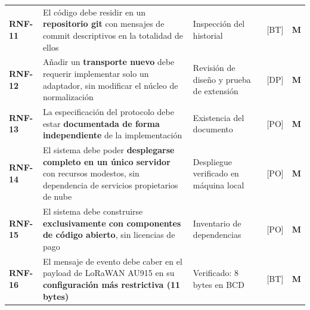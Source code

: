 \begin{longtable}{@{}C{1.7cm}L{7.6cm}L{2.0cm}L{1.4cm}C{1.2cm}@{}}
\textbf{RNF-11} & El código debe residir en un \textbf{repositorio git} con mensajes de commit descriptivos en la totalidad de ellos & Inspección del historial & [BT] & \textbf{M} \\
\textbf{RNF-12} & Añadir un \textbf{transporte nuevo} debe requerir implementar solo un adaptador, sin modificar el núcleo de normalización & Revisión de diseño y prueba de extensión & [DP] & \textbf{M} \\
\textbf{RNF-13} & La especificación del protocolo debe estar \textbf{documentada de forma independiente} de la implementación & Existencia del documento & [PO] & \textbf{M} \\
\textbf{RNF-14} & El sistema debe poder \textbf{desplegarse completo en un único servidor} con recursos modestos, sin dependencia de servicios propietarios de nube & Despliegue verificado en máquina local & [PO] & \textbf{M} \\
\textbf{RNF-15} & El sistema debe construirse \textbf{exclusivamente con componentes de código abierto}, sin licencias de pago & Inventario de dependencias & [PO] & \textbf{M} \\
\textbf{RNF-16} & El mensaje de evento debe caber en el payload de LoRaWAN AU915 en su \textbf{configuración más restrictiva (11 bytes)} & Verificado: 8 bytes en BCD & [BT] & \textbf{M} \\
\end{longtable}
